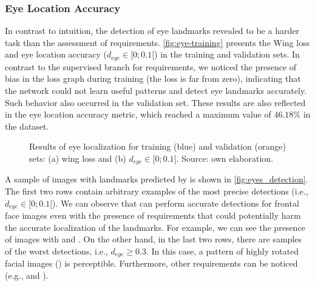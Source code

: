 
 
\subsubsection{Eye Location Accuracy} \label{sec:eye_location_acc}
 
In contrast to intuition, the detection of eye landmarks revealed to be a harder task than the assessment of \icao requirements. \autoref{fig:eye-training} presents the Wing loss and eye location accuracy ($d_{eye} \in [0;0.1[$) in the training and validation sets. In contrast to the supervised branch for requirements, we noticed the presence of bias in the loss graph during training (the loss is far from zero), indicating that the network could not learn useful patterns and detect eye landmarks accurately. Such behavior also occurred in the validation set. These results are also reflected in the eye location accuracy metric, which reached a maximum value of $46.18\%$ in the \adhoc dataset. 
 
\begin{figure}[htb]
\centering
{}
\hfill
{}
\caption{Results of eye localization for training (blue) and validation (orange) sets: (a) wing loss and (b) $d_{eye} \in [0;0.1[$. Source: own elaboration.}
\label{fig:eye-training}
\end{figure}
 
A sample of images with landmarks predicted by \methodname is shown in \autoref{fig:eyes_detection}. The first two rows contain arbitrary examples of the most precise detections (i.e., $d_{eye} \in [0;0.1[$). We can observe that \methodname can perform accurate detections for frontal face images even with the presence of requirements that could potentially harm the accurate localization of the landmarks. For example, we can see the presence of images with \framecoveringeyes and \toodarklight. On the other hand, in the last two rows, there are samples of the worst detections, i.e., $d_{eye} \geq 0.3$. In this case, a pattern of highly rotated facial images (\rollpitchyaw) is perceptible. Furthermore, other requirements can be noticed (e.g., \blurred and \framestooheavy).
 

